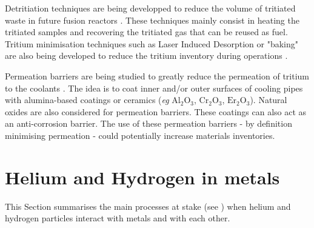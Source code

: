 Detritiation techniques are being developped to reduce the volume of tritiated waste in future fusion reactors .
These techniques mainly consist in heating the tritiated samples and recovering the tritiated gas  that can be reused as fuel.
Tritium minimisation techniques such as Laser Induced Desorption or "baking" are also being developed to reduce the tritium inventory during operations .

Permeation barriers are being studied to greatly reduce the permeation of tritium to the coolants .
The idea is to coat inner and/or outer surfaces of cooling pipes with alumina-based coatings or ceramics (\textit{eg} $\mathrm{Al_2 O_3}$, $\mathrm{Cr_2 O_3}$, $\mathrm{Er_2 O_3}$).
Natural oxides are also considered for permeation barriers.
These coatings can also act as an anti-corrosion barrier.
The use of these permeation barriers - by definition minimising permeation - could potentially increase materials inventories.

\section{Helium and Hydrogen in metals}

This Section summarises the main processes at stake (see ) when helium and hydrogen particles interact with metals and with each other.

